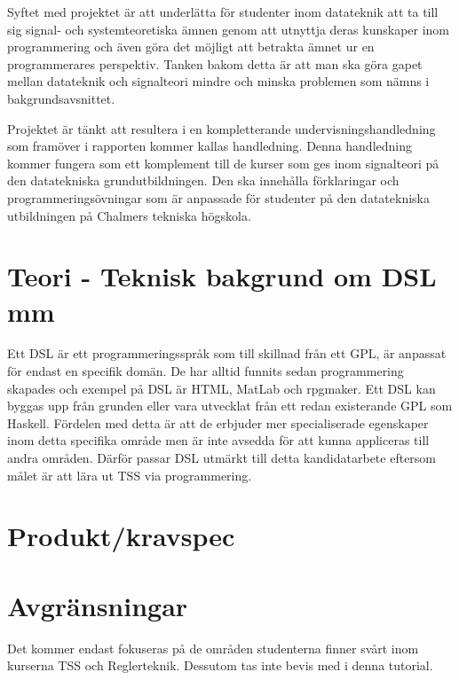 \documentclass[]{article}
\begin{document}
%

Syftet med projektet är att underlätta för studenter inom datateknik att
ta till sig signal- och systemteoretiska ämnen genom att utnyttja deras
kunskaper inom programmering och även göra det möjligt att betrakta ämnet ur
en programmerares perspektiv. Tanken bakom detta är att man ska göra gapet
mellan datateknik och signalteori mindre och minska problemen som nämns
i bakgrundsavsnittet.

Projektet är tänkt att resultera i en kompletterande undervisningshandledning som
framöver i rapporten kommer kallas handledning.
Denna handledning kommer fungera som ett komplement till de kurser som ges inom
signalteori på den datatekniska grundutbildningen. Den ska innehålla
förklaringar och programmeringsövningar som är anpassade för studenter på den
datatekniska utbildningen på Chalmers tekniska högskola.

\section{Teori - Teknisk bakgrund om DSL mm}

Ett DSL är ett programmeringsspråk som till skillnad från ett GPL, är anpassat
för endast en specifik domän. De har alltid funnits sedan programmering
skapades och exempel på DSL är HTML, MatLab och rpgmaker. Ett DSL kan
byggas upp från grunden eller vara utvecklat från ett redan existerande GPL
som Haskell. Fördelen med detta är att de erbjuder mer specialiserade egenskaper
inom detta specifika område men är inte avsedda för att kunna appliceras till andra
områden. Därför passar DSL utmärkt till detta kandidatarbete eftersom målet är
att lära ut TSS via programmering.

\section{Produkt/kravspec}

\section{Avgränsningar}

%

Det kommer endast fokuseras på de områden studenterna finner svårt inom
kurserna TSS och Reglerteknik. Dessutom tas inte bevis med i denna tutorial.
\end{document}
